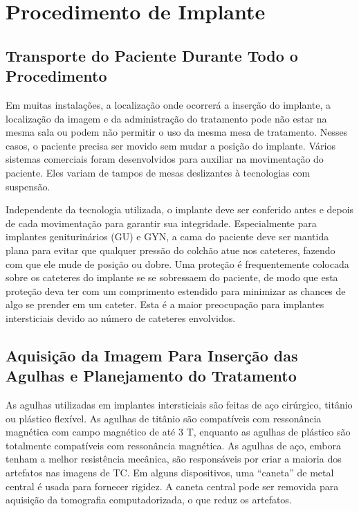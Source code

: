 \documentclass[11pt,a4paper]{article}
\begin{document}
\section{Procedimento de Implante}

\subsection*{Transporte do Paciente Durante Todo o Procedimento}

	Em muitas instalações, a localização onde ocorrerá a inserção do implante, a localização da imagem e da administração do tratamento pode não estar na mesma sala ou podem não permitir o uso da mesma mesa de tratamento. Nesses casos, o paciente precisa ser movido sem mudar a posição do implante. Vários sistemas comerciais foram desenvolvidos para auxiliar na movimentação do paciente. Eles variam de tampos de mesas deslizantes à tecnologias com suspensão.
	
	Independente da tecnologia utilizada, o implante deve ser conferido antes e depois de cada movimentação para garantir sua integridade. Especialmente para implantes geniturinários (GU) e GYN, a cama do paciente deve ser mantida plana para evitar que qualquer pressão do colchão atue nos cateteres, fazendo com que ele mude de posição ou dobre. Uma proteção é frequentemente colocada sobre os cateteres do implante se se sobressaem do paciente, de modo que esta proteção deva ter com um comprimento estendido para minimizar as chances de algo se prender em um cateter. Esta é a maior preocupação para implantes intersticiais devido ao número de cateteres envolvidos.

\subsection*{Aquisição da Imagem Para Inserção das Agulhas e Planejamento do Tratamento}

	As agulhas utilizadas em implantes intersticiais são feitas de aço cirúrgico, titânio ou plástico flexível. As agulhas de titânio são compatíveis com ressonância magnética com campo magnético de até 3 T, enquanto as agulhas de plástico são totalmente compatíveis com ressonância magnética. As agulhas de aço, embora tenham a melhor resistência mecânica, são responsáveis por criar a maioria dos artefatos nas imagens de TC. Em alguns dispositivos, uma ``caneta'' de metal central é usada para fornecer rigidez. A caneta central pode ser removida para aquisição da tomografia computadorizada, o que reduz os artefatos.
\end{document}
